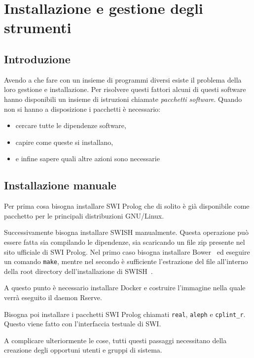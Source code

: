 \documentclass[10pt,titlepage,twoside,a4paper]{report}
\begin{document}


\chapter{Installazione e gestione degli strumenti} 
\label{ch:installazione-e-gestione-degli-strumenti}

\section{Introduzione}
Avendo a che fare con un insieme di programmi diversi esiste il problema della 
loro gestione e installazione. Per risolvere questi fattori alcuni di questi 
software hanno disponibili un insieme di istruzioni chiamate \emph{pacchetti 
software}.
Quando non si hanno a disposizione i pacchetti è necessario:
\begin{itemize}
    \item cercare tutte le dipendenze software,
    \item capire come queste si installano,
    \item e infine sapere quali altre azioni sono necessarie
\end{itemize}

\section{Installazione manuale}
Per prima cosa bisogna installare SWI Prolog che di
solito è già disponibile come pacchetto per le principali distribuzioni 
GNU/Linux.

Successivamente bisogna installare SWISH manualmente. Questa operazione può 
essere fatta sia compilando le dipendenze, sia scaricando un file zip presente 
nel sito ufficiale di SWI Prolog. Nel primo caso bisogna installare 
Bower~\cite{bower} ed eseguire un comando \texttt{make}, mentre nel secondo è 
sufficiente l'estrazione del file all'interno della root directory 
dell'installazione di SWISH~\cite{swishManualInstallation}.

A questo punto è necessario installare Docker e costruire l'immagine nella 
quale verrà eseguito il daemon Rserve.

Bisogna poi installare i pacchetti SWI Prolog 
chiamati \texttt{real}, \texttt{aleph} e \texttt{cplint\_r}. Questo viene 
fatto con l'interfaccia testuale di SWI.

A complicare ulteriormente le cose, tutti questi passaggi necessitano della 
creazione degli opportuni utenti e gruppi di sistema.
\end{document}
